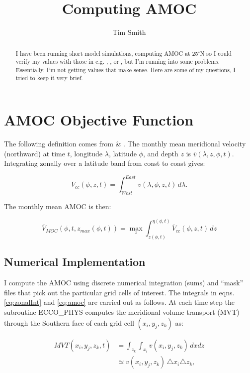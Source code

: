 \documentclass[a4paper,11pt]{article}
\title{\vspace{-10ex}Computing AMOC}
\author{Tim Smith}
\date{\vspace{-3ex}}
\begin{document}
\maketitle

\begin{abstract}
 I have been running short model simulations, computing AMOC at 25$^{\circ}$N so I could verify my values with those in e.g. \cite{wunschLinear}, \cite{wunschAndHeimbach_AMOC}, or \cite{mcCarthy}, but I'm running into some problems. Essentially, I'm not getting values that make sense. Here are some of my questions, I tried to keep it very brief. 
\end{abstract}


\section{AMOC Objective Function}

  The following definition comes from \cite{wunschLinear} \& \cite{wunschAndHeimbach_AMOC}. The monthly mean meridional velocity (northward) at time $t$, longitude $\lambda$, latitude $\phi$, and depth $z$ is $\bar{v}(\lambda,z,\phi,t)$. Integrating zonally over a latitude band from coast to coast gives: 
  
  \begin{equation}
   \bar{V}_{cc}(\phi,z,t) = \int_{West}^{East}\bar{v}(\lambda,\phi,z,t)\,d\lambda .
   \label{eq:zonalInt}
  \end{equation}

  The monthly mean AMOC is then: 
  
  \begin{equation}
    \bar{V}_{MOC}(\phi,t,z_{max}(\phi,t)) = \max_z\int_{z(\phi,t)}^{\eta(\phi,t)}\bar{V}_{cc}(\phi,z,t) \, dz
    \label{eq:amoc}
  \end{equation}
  
  \subsection{Numerical Implementation}
  
  I compute the AMOC using discrete numerical integration (sums) and ``mask'' files that pick out the particular grid cells of interest. The integrals in eqns. \ref{eq:zonalInt} and \ref{eq:amoc} are carried out as follows. At each time step the subroutine ECCO\_PHYS computes the meridional volume transport (MVT) through the Southern face of each grid cell $(x_i,y_j,z_k)$ as: 
  
  \begin{align}
    MVT(x_i,y_j,z_k,t) &= \int_{z_k}\int_{x_i}v(x_i,y_j,z_k) \,dx dz \\
				    &\simeq v(x_i,y_j,z_k) \,  \triangle x_i \triangle z_k ,
    \label{eq:MVT}
  \end{align}
  
\end{document}
